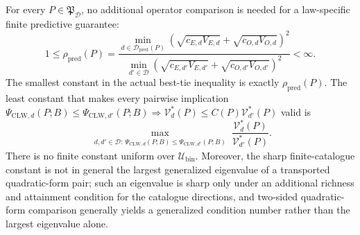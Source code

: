For every \(P\in\mathfrak P_{\mathcal D}\), no additional operator comparison is needed for a law-specific finite predictive guarantee:
\[
 1\le\rho_{\mathrm{pred}}(P)
 =\frac{\min_{d\in\mathcal D_{\mathrm{pred}}(P)}
 (\sqrt{c_{E,d}V_{E,d}}+\sqrt{c_{O,d}V_{O,d}})^2}
 {\min_{d'\in\mathcal D}
 (\sqrt{c_{E,d'}V_{E,d'}}+\sqrt{c_{O,d'}V_{O,d'}})^2}<\infty.
\]
The smallest constant in the actual best-tie inequality is exactly \(\rho_{\mathrm{pred}}(P)\).  The least constant that makes every pairwise implication
\(\Psi_{\mathrm{CLW},d}(P;B)\le\Psi_{\mathrm{CLW},d'}(P;B)\Rightarrow
\mathcal V_d^*(P)\le C(P)\mathcal V_{d'}^*(P)\)
valid is
\[
 \max_{\substack{d,d'\in\mathcal D:\,
 \Psi_{\mathrm{CLW},d}(P;B)\le\Psi_{\mathrm{CLW},d'}(P;B)}}
 \frac{\mathcal V_d^*(P)}{\mathcal V_{d'}^*(P)}.
\]
There is no finite constant uniform over \(\mathcal U_{\mathrm{bin}}\).  Moreover, the sharp finite-catalogue constant is not in general the largest generalized eigenvalue of a transported quadratic-form pair; such an eigenvalue is sharp only under an additional richness and attainment condition for the catalogue directions, and two-sided quadratic-form comparison generally yields a generalized condition number rather than the largest eigenvalue alone.
